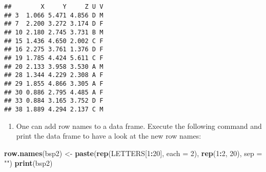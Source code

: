 \documentclass[]{article}
\newenvironment{Shaded}{\begin{snugshade}}{\end{snugshade}}
\newcommand{\KeywordTok}[1]{\textcolor[rgb]{0.13,0.29,0.53}{\textbf{#1}}}
\newcommand{\DataTypeTok}[1]{\textcolor[rgb]{0.13,0.29,0.53}{#1}}
\newcommand{\DecValTok}[1]{\textcolor[rgb]{0.00,0.00,0.81}{#1}}
\newcommand{\StringTok}[1]{\textcolor[rgb]{0.31,0.60,0.02}{#1}}
\newcommand{\OperatorTok}[1]{\textcolor[rgb]{0.81,0.36,0.00}{\textbf{#1}}}
\newcommand{\NormalTok}[1]{#1}
\providecommand{\tightlist}{%
  \setlength{\itemsep}{0pt}\setlength{\parskip}{0pt}}
\begin{document}
\begin{Shaded}
\end{Shaded}

\begin{verbatim}
##        X     Y     Z U V
## 3  1.066 5.471 4.856 D M
## 7  2.200 3.272 3.174 D F
## 10 2.180 2.745 3.731 B M
## 15 1.436 4.650 2.002 C F
## 16 2.275 3.761 1.376 D F
## 19 1.785 4.424 5.611 C F
## 20 2.133 3.958 3.530 A M
## 28 1.344 4.229 2.308 A F
## 29 1.855 4.866 3.305 A F
## 30 0.886 2.795 4.485 A F
## 33 0.884 3.165 3.752 D F
## 38 1.889 4.294 2.137 C M
\end{verbatim}

\begin{enumerate}
\def\labelenumi{\arabic{enumi}.}
\setcounter{enumi}{5}
\tightlist
\item
  One can add row names to a data frame. Execute the following command
  and print the data frame to have a look at the new row names:
\end{enumerate}

\begin{Shaded}
\begin{Highlighting}[]
\KeywordTok{row.names}\NormalTok{(bsp2) <-}\StringTok{ }\KeywordTok{paste}\NormalTok{(}\KeywordTok{rep}\NormalTok{(LETTERS[}\DecValTok{1}\OperatorTok{:}\DecValTok{20}\NormalTok{], }\DataTypeTok{each =} \DecValTok{2}\NormalTok{), }\KeywordTok{rep}\NormalTok{(}\DecValTok{1}\OperatorTok{:}\DecValTok{2}\NormalTok{, }\DecValTok{20}\NormalTok{), }\DataTypeTok{sep =} \StringTok{""}\NormalTok{)}
\KeywordTok{print}\NormalTok{(bsp2)}
\end{Highlighting}
\end{Shaded}
\end{document}
